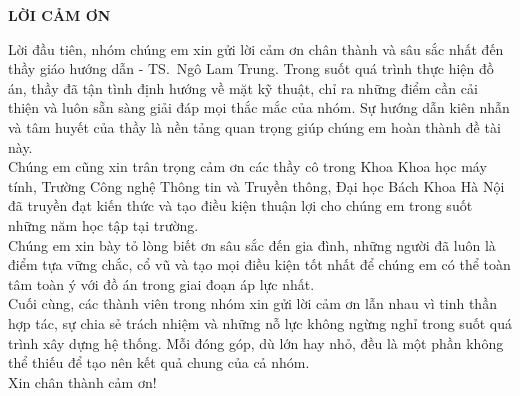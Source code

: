 \documentclass[../DoAn.tex]{subfiles}
\begin{document}
\begin{center}
    \Large{\textbf{LỜI CẢM ƠN}}\\
\end{center}
\vspace{1cm}
Lời đầu tiên, nhóm chúng em xin gửi lời cảm ơn chân thành và sâu sắc nhất đến thầy giáo hướng dẫn - TS.~Ngô Lam Trung. Trong suốt quá trình thực hiện đồ án, thầy đã tận tình định hướng về mặt kỹ thuật, chỉ ra những điểm cần cải thiện và luôn sẵn sàng giải đáp mọi thắc mắc của nhóm. Sự hướng dẫn kiên nhẫn và tâm huyết của thầy là nền tảng quan trọng giúp chúng em hoàn thành đề tài này.\\

Chúng em cũng xin trân trọng cảm ơn các thầy cô trong Khoa Khoa học máy tính, Trường Công nghệ Thông tin và Truyền thông, Đại học Bách Khoa Hà Nội đã truyền đạt kiến thức và tạo điều kiện thuận lợi cho chúng em trong suốt những năm học tập tại trường.\\

Chúng em xin bày tỏ lòng biết ơn sâu sắc đến gia đình, những người đã luôn là điểm tựa vững chắc, cổ vũ và tạo mọi điều kiện tốt nhất để chúng em có thể toàn tâm toàn ý với đồ án trong giai đoạn áp lực nhất.\\

Cuối cùng, các thành viên trong nhóm xin gửi lời cảm ơn lẫn nhau vì tinh thần hợp tác, sự chia sẻ trách nhiệm và những nỗ lực không ngừng nghỉ trong suốt quá trình xây dựng hệ thống. Mỗi đóng góp, dù lớn hay nhỏ, đều là một phần không thể thiếu để tạo nên kết quả chung của cả nhóm.\\

Xin chân thành cảm ơn!
\end{document}
